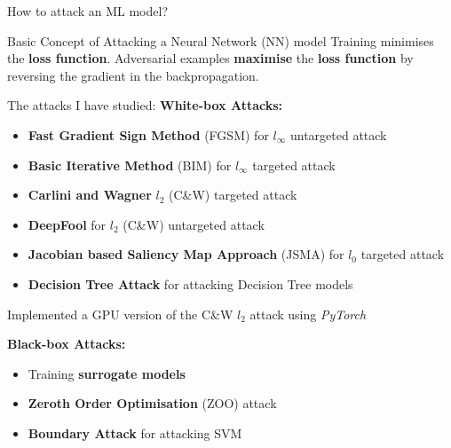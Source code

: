 \documentclass[9pt]{beamer}
\begin{document}
\begin{frame}{How to attack an ML model?}
\begin{block}{Basic Concept of Attacking a Neural Network (NN) model}
Training minimises the \textbf{loss function}. Adversarial examples \textbf{maximise} the \textbf{loss function} by reversing the gradient in the backpropagation.
\end{block}

{
\small
The attacks I have studied:
\textbf{White-box Attacks:}
\begin{itemize}
    \item \textbf{Fast Gradient Sign Method} (FGSM) for $l_\infty$ untargeted attack 
    \item \textbf{Basic Iterative Method} (BIM) for $l_\infty$ targeted attack 
    \item \textbf{Carlini and Wagner} $l_2$ (C\&W) targeted attack 
    \item \textbf{DeepFool} for $l_2$ (C\&W) untargeted attack 
    \item \textbf{Jacobian based Saliency Map Approach} (JSMA) for $l_0$ targeted attack 
    \item \textbf{Decision Tree Attack} for attacking Decision Tree models
\end{itemize}

Implemented a GPU version of the C\&W $l_2$ attack using \textit{PyTorch}

\textbf{Black-box Attacks:}
\begin{itemize}
    \item Training \textbf{surrogate models}
    \item \textbf{Zeroth Order Optimisation} (ZOO) attack
    \item \textbf{Boundary Attack} for attacking SVM
\end{itemize}
}

\end{frame}
\end{document}

